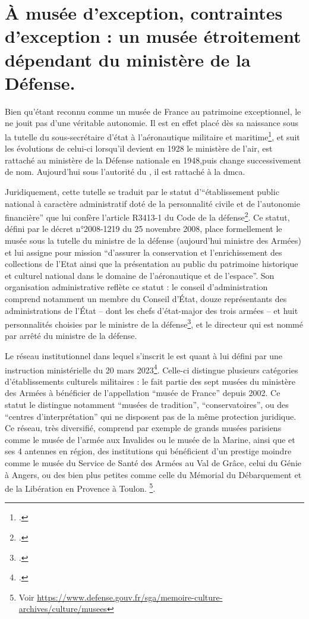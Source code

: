 \section{\label{I-B-1}À musée d'exception, contraintes d'exception : un musée étroitement dépendant du ministère de la Défense. }

Bien qu'étant reconnu comme un musée de France au patrimoine exceptionnel, le \mae ne jouit pas d'une véritable autonomie. Il est en effet placé dès sa naissance sous la tutelle du sous-secrétaire d'état à l'aéronautique militaire et maritime\footcite{terrierAeroportParisBourget2019}, et suit les évolutions de celui-ci lorsqu'il devient en 1928 le ministère de l'air, est rattaché au ministère de la Défense nationale en 1948,puis change successivement de nom. Aujourd'hui sous l'autorité du \minarm, il est rattaché à la \gls{dmca}.

Juridiquement, cette tutelle se traduit par le statut d'\enquote{établissement public national à caractère administratif doté de la personnalité civile et de l'autonomie financière} que lui confère l'article R3413-1 du Code de la défense\footcite{ArticleR34131Code2008}. Ce statut, défini par le décret n°2008-1219 du 25 novembre 2008, place formellement le musée sous la tutelle du ministre de la défense (aujourd'hui ministre des Armées) et lui assigne pour mission  \enquote{d'assurer la conservation et l'enrichissement des collections de l'Etat ainsi que la présentation au public du patrimoine historique et culturel national dans le domaine de l'aéronautique et de l'espace}. Son organisation administrative reflète ce statut : le conseil d'administration comprend notamment un membre du Conseil d'État, douze représentants des administrations de l'État -- dont les chefs d'état-major des trois armées -- et huit personnalités choisies par le ministre de la défense\footcite{ArticleR341373Code2013}, et le directeur qui est nommé par arrêté du ministre de la défense.

Le réseau institutionnel dans lequel s'inscrit le \mae est quant à lui défini  par une instruction ministérielle du 20 mars 2023\footcite{ministeredesarmeesInstructionNdeg303ARM2023}. 
Celle-ci distingue plusieurs catégories d'établissements culturels militaires : le \mae fait partie des sept musées du ministère des Armées à bénéficier de l'appellation \enquote{musée de France} depuis 2002. Ce statut le distingue notamment \enquote{musées de tradition}, \enquote{conservatoires}, ou des \enquote{centres d'interprétation} qui ne disposent pas de la même protection juridique. Ce réseau, très diversifié, comprend par exemple de grands musées parisiens comme le musée de l'armée aux Invalides ou le musée de la Marine, ainsi que et ses 4 antennes en région, des institutions qui bénéficient d'un prestige moindre comme le musée du Service de Santé des Armées au Val de Grâce, celui du Génie à Angers, ou des bien plus petites comme celle du Mémorial du Débarquement et de la Libération en Provence à Toulon.
\footnote{Voir \url{https://www.defense.gouv.fr/sga/memoire-culture-archives/culture/musees}}.



